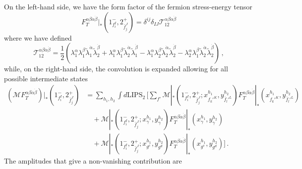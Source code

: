 On the left-hand side, we have the form factor of the fermion stress-energy tensor
\begin{equation}
    F_T^{\alpha\beta\dot\alpha\dot\beta}|_{*}(1_{f_i^I}^{-},2_{\bar f_j^J}^{+}) = \delta^{ij}\delta_{IJ}\mathcal T^{\alpha\beta\dot\alpha\dot\beta}_{12}
\end{equation}
where we have defined
\begin{equation}
    \mathcal T^{\alpha\beta\dot\alpha\dot\beta}_{12} = \frac{1}{2}\left( \lambda_1^\alpha \lambda_1^\beta \tilde\lambda_1^{\dot\alpha} \tilde\lambda_2^{\dot\beta} + \lambda_1^\alpha \lambda_1^\beta \tilde\lambda_2^{\dot\alpha} \tilde\lambda_1^{\dot\beta} - \lambda_1^\alpha \lambda_2^\beta \tilde\lambda_2^{\dot\alpha} \tilde\lambda_2^{\dot\beta} - \lambda_2^\alpha \lambda_1^\beta \tilde\lambda_2^{\dot\alpha} \tilde\lambda_2^{\dot\beta}  \right)\,,
\end{equation}
while, on the right-hand side, the convolution is expanded allowing for all possible intermediate states
\begin{align}
    (\mathcal M F_T^{\alpha\beta\dot\alpha\dot\beta})|_{*}(1_{f_i^I}^{-},2_{\bar f_j^J}^{+}) &= \sum_{h_1,h_2}\int d\text{LIPS}_2\,
    \bigg[\sum_{f'}
     \mathcal M|_{*} (1_{f_i^I}^{-},2_{\bar f_j^J}^{+}; x_{f_k'^K}^{h_1},y_{\bar f_l'^L}^{h_2})F_T^{\alpha\beta\dot\alpha\dot\beta}|_{*}(x_{f_k'^K}^{h_1},y_{\bar f_l'^L}^{h_2})\nonumber \\
    &\quad + \mathcal M|_{*} (1_{f_i^I}^{-},2_{\bar f_j^J}^{+}; x_\gamma^{h_1},y_\gamma^{h_2})F_T^{\alpha\beta\dot\alpha\dot\beta}|_{*}(x_\gamma^{h_1},y_\gamma^{h_2})\nonumber \\
    &\quad+ \mathcal M|_{*} (1_{f_i^I}^{-},2_{\bar f_j^J}^{+}; x_{g^c}^{h_1},y_{g^d}^{h_2})F_T^{\alpha\beta\dot\alpha\dot\beta}|_{*}(x_{g^c}^{h_1},y_{g^d}^{h_2})
    \bigg]\,.
\end{align}
The amplitudes that give a non-vanishing contribution are
